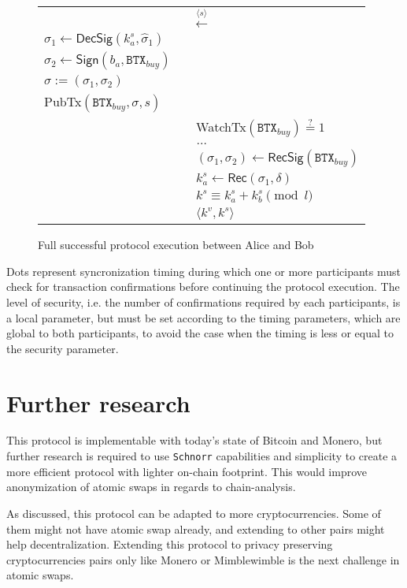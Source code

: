 \documentclass{llncs}
\newcommand{\BTX}{\texttt{BTX}}
\newcommand{\DecSig}{\textsf{DecSig}}
\newcommand{\Sign}{\textsf{Sign}}
\newcommand{\Rec}{\textsf{Rec}}
\newcommand{\hatsigma}{\hat{\sigma}}
\newcommand{\PubTx}{\textsf{PubTx}}
\newcommand{\WatchTx}{\textsf{WatchTx}}
\newcommand{\RecSig}{\textsf{RecSig}}
\begin{document}
\begin{figure}[H]
\begin{table}[H]
{\begin{tabular}{ | l c l | }
          \multicolumn{3}{|c|}{$\xleftarrow{\langle s \rangle}$} \\

          $\sigma_1 \gets \DecSig(k^s_a, \hatsigma_1)$ & & \\
          $\sigma_2 \gets \Sign(b_a, \BTX_\textit{buy})$ & & \\
          $\sigma := (\sigma_1, \sigma_2)$ & & \\
          \PubTx$(\BTX_\textit{buy}, \sigma, s)$ & & \\

          & & \WatchTx$(\BTX_\textit{buy}) \stackrel{?}{=} 1$ \\
          \multicolumn{3}{|c|}{$\dots$} \\

          & & $(\sigma_1, \sigma_2) \gets \RecSig(\BTX_\textit{buy})$ \\
          & & $k^s_a \gets \Rec(\sigma_1, \delta)$ \\
          & & $k^s \equiv k^s_a + k^s_b \pmod l$ \\
          & & $\langle k^v, k^s \rangle$ \\
        \hline
      \end{tabular}}
    \end{table}
  \caption{Full successful protocol execution between Alice and Bob}
  \label{fig:protocol}
\end{figure}

Dots represent syncronization timing during which one or more participants must check for transaction confirmations before continuing the protocol execution. The level of security, i.e. the number of confirmations required by each participants, is a local parameter, but must be set according to the timing parameters, which are global to both participants, to avoid the case when the timing is less or equal to the security parameter.

\section{Further research}
This protocol is implementable with today's state of Bitcoin and Monero, but further research is required to use \texttt{Schnorr} capabilities and simplicity to create a more efficient protocol with lighter on-chain footprint. This would improve anonymization of atomic swaps in regards to chain-analysis.

As discussed, this protocol can be adapted to more cryptocurrencies. Some of them might not have atomic swap already, and extending to other pairs might help decentralization. Extending this protocol to privacy preserving cryptocurrencies pairs only like Monero or Mimblewimble is the next challenge in atomic swaps.
\end{document}
